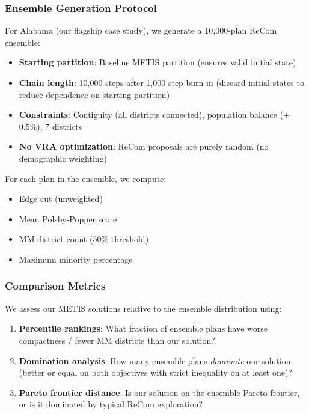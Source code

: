 \subsubsection{Ensemble Generation Protocol}

For Alabama (our flagship case study), we generate a 10,000-plan ReCom ensemble:

\begin{itemize}
    \item \textbf{Starting partition}: Baseline METIS partition (ensures valid initial state)
    \item \textbf{Chain length}: 10,000 steps after 1,000-step burn-in (discard initial states to reduce dependence on starting partition)
    \item \textbf{Constraints}: Contiguity (all districts connected), population balance ($\pm$0.5\%), 7 districts
    \item \textbf{No VRA optimization}: ReCom proposals are purely random (no demographic weighting)
\end{itemize}

For each plan in the ensemble, we compute:
\begin{itemize}
    \item Edge cut (unweighted)
    \item Mean Polsby-Popper score
    \item MM district count (50\% threshold)
    \item Maximum minority percentage
\end{itemize}

\subsubsection{Comparison Metrics}

We assess our METIS solutions relative to the ensemble distribution using:

\begin{enumerate}
    \item \textbf{Percentile rankings}: What fraction of ensemble plans have worse compactness / fewer MM districts than our solution?
    \item \textbf{Domination analysis}: How many ensemble plans \emph{dominate} our solution (better or equal on both objectives with strict inequality on at least one)?
    \item \textbf{Pareto frontier distance}: Is our solution on the ensemble Pareto frontier, or is it dominated by typical ReCom exploration?
\end{enumerate}

